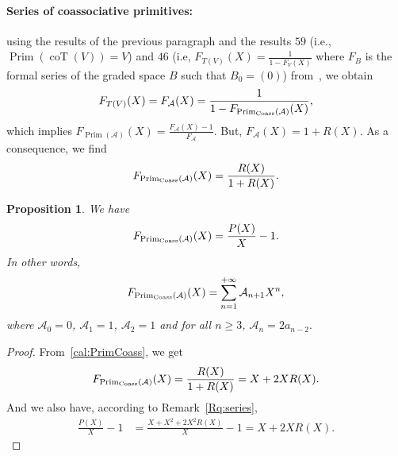 \documentclass[pdftex]{sigma}
\numberwithin{equation}{section}
\theoremstyle{definition}
\theoremstyle{plain}
\newtheorem{Prop}[defi]{Proposition}
\DeclareMathOperator{\Prim}{Prim}
\DeclareMathOperator{\coT}{coT}
\begin{document}
\paragraph{Series of coassociative primitives:}

using the results of the previous paragraph and the results $59$ (i.e., $\Prim(\coT(V))=V$) and $46$ (i.e, $F_{T(V)}(X)=\frac{1}{1-F_V(X)}$ where $F_B$ is the formal series of the graded space $B$ such that $B_0=(0)$) from~\cite{algHopf}, we obtain
\begin{align*}
	F_{T(V)}(X)=F_\mathcal{A}(X)=\frac{1}{1-F_{\Prim_{\rm Coass}(\mathcal{A})}(X)},
\end{align*}
which implies $F_{\Prim(\mathcal{A})}(X)=\frac{F_\mathcal{A}(X)-1}{F_\mathcal{A}}.$
But, $F_\mathcal{A}(X)=1+R(X).$ As a consequence, we find
\[
F_{\Prim_{\rm Coass}(\mathcal{A})}(X)=\frac{R(X)}{1+R(X)}.
\]

\begin{Prop}\label{nbcoass}
	We have
	\[
	F_{\Prim_{\rm Coass}(\mathcal{A})}(X)=\frac{P(X)}{X}-1.
	\]
	In other words,
	\[
	F_{\Prim_{\rm Coass}(\mathcal{A})}(X)=\sum_{n=1}^{+\infty} \mathcal{A}_{n+1}X^n,
	\]
	where $\mathcal{A}_0=0$, $\mathcal{A}_1=1$, $\mathcal{A}_2=1$ and for all $n\geq 3$, $\mathcal{A}_n=2a_{n-2}.$
\end{Prop}
\begin{proof}
		From~\eqref{cal:PrimCoass}, we get
\begin{align*}
	F_{\Prim_{\rm Coass}(\mathcal{A})}(X)=\frac{R(X)}{1+R(X)}
						 =X+2XR(X).
\end{align*}
And we also have, according to Remark~\ref{Rq:series},
\begin{align*}
	\frac{P(X)}{X}-1&=\frac{X+X^2+2X^2R(X)}{X}-1=X+2XR(X). \tag*{\qed}
\end{align*}
\renewcommand{\qed}{}
\end{proof}
\end{document}
